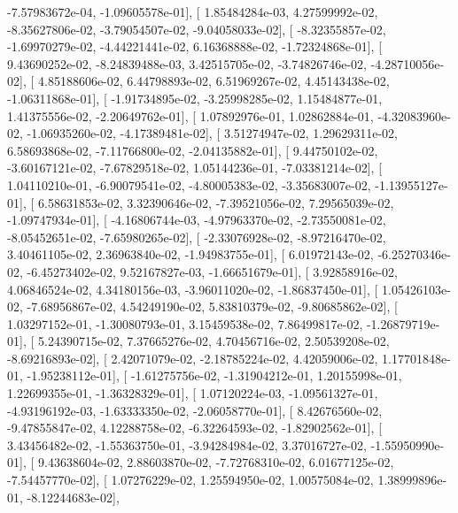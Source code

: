 \documentclass{article}
\begin{document}
         -7.57983672e-04,  -1.09605578e-01],
       [  1.85484284e-03,   4.27599992e-02,  -8.35627806e-02,
         -3.79054507e-02,  -9.04058033e-02],
       [ -8.32355857e-02,  -1.69970279e-02,  -4.44221441e-02,
          6.16368888e-02,  -1.72324868e-01],
       [  9.43690252e-02,  -8.24839488e-03,   3.42515705e-02,
         -3.74826746e-02,  -4.28710056e-02],
       [  4.85188606e-02,   6.44798893e-02,   6.51969267e-02,
          4.45143438e-02,  -1.06311868e-01],
       [ -1.91734895e-02,  -3.25998285e-02,   1.15484877e-01,
          1.41375556e-02,  -2.20649762e-01],
       [  1.07892976e-01,   1.02862884e-01,  -4.32083960e-02,
         -1.06935260e-02,  -4.17389481e-02],
       [  3.51274947e-02,   1.29629311e-02,   6.58693868e-02,
         -7.11766800e-02,  -2.04135882e-01],
       [  9.44750102e-02,  -3.60167121e-02,  -7.67829518e-02,
          1.05144236e-01,  -7.03381214e-02],
       [  1.04110210e-01,  -6.90079541e-02,  -4.80005383e-02,
         -3.35683007e-02,  -1.13955127e-01],
       [  6.58631853e-02,   3.32390646e-02,  -7.39521056e-02,
          7.29565039e-02,  -1.09747934e-01],
       [ -4.16806744e-03,  -4.97963370e-02,  -2.73550081e-02,
         -8.05452651e-02,  -7.65980265e-02],
       [ -2.33076928e-02,  -8.97216470e-02,   3.40461105e-02,
          2.36963840e-02,  -1.94983755e-01],
       [  6.01972143e-02,  -6.25270346e-02,  -6.45273402e-02,
          9.52167827e-03,  -1.66651679e-01],
       [  3.92858916e-02,   4.06846524e-02,   4.34180156e-03,
         -3.96011020e-02,  -1.86837450e-01],
       [  1.05426103e-02,  -7.68956867e-02,   4.54249190e-02,
          5.83810379e-02,  -9.80685862e-02],
       [  1.03297152e-01,  -1.30080793e-01,   3.15459538e-02,
          7.86499817e-02,  -1.26879719e-01],
       [  5.24390715e-02,   7.37665276e-02,   4.70456716e-02,
          2.50539208e-02,  -8.69216893e-02],
       [  2.42071079e-02,  -2.18785224e-02,   4.42059006e-02,
          1.17701848e-01,  -1.95238112e-01],
       [ -1.61275756e-02,  -1.31904212e-01,   1.20155998e-01,
          1.22699355e-01,  -1.36328329e-01],
       [  1.07120224e-03,  -1.09561327e-01,  -4.93196192e-03,
         -1.63333350e-02,  -2.06058770e-01],
       [  8.42676560e-02,  -9.47855847e-02,   4.12288758e-02,
         -6.32264593e-02,  -1.82902562e-01],
       [  3.43456482e-02,  -1.55363750e-01,  -3.94284984e-02,
          3.37016727e-02,  -1.55950990e-01],
       [  9.43638604e-02,   2.88603870e-02,  -7.72768310e-02,
          6.01677125e-02,  -7.54457770e-02],
       [  1.07276229e-02,   1.25594950e-02,   1.00575084e-02,
          1.38999896e-01,  -8.12244683e-02],
\end{document}
